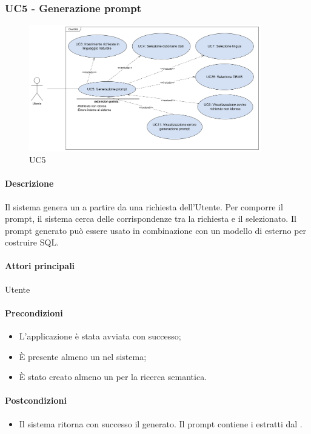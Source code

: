 \subsubsection{UC5 - Generazione prompt}\label{UC5}

\begin{figure}[H]
  \centering
  \includegraphics[width=0.90\textwidth]{assets/uc5.png}
  \caption{UC5}
\end{figure}

\paragraph*{Descrizione}
Il sistema genera un  a partire da una richiesta dell'Utente. Per comporre il prompt, il sistema cerca delle corrispondenze tra la richiesta e il  selezionato. Il prompt generato può essere usato in combinazione con un modello di  esterno per costruire  SQL.

\paragraph*{Attori principali}
Utente

\paragraph*{Precondizioni}
\begin{itemize}
  \item L'applicazione è stata avviata con successo;
  \item È presente almeno un  nel sistema;
  \item È stato creato almeno un  per la ricerca semantica.
\end{itemize}

\paragraph*{Postcondizioni}
\begin{itemize}
  \item Il sistema ritorna con successo il  generato. Il prompt contiene i  estratti dal .
\end{itemize}

